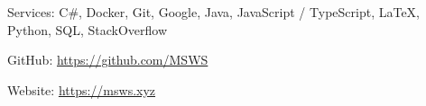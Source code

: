 \documentclass[10pt,letterpaper]{article}
\newenvironment{indentsection}[1]%
{\begin{list}{}%
	{\setlength{\leftmargin}{#1}}%
	\item[]%
}
{\end{list}}
\begin{document}
\begin{indentsection}{\parindent}
    \begin{description*}
        \item[Services:]
        C\#, Docker, Git, Google, Java, JavaScript / TypeScript, \LaTeX, Python, SQL, StackOverflow
        \item[GitHub:] \href{https://github.com/MSWS}{https://github.com/MSWS}
        \item[Website:] \href{https://msws.xyz}{https://msws.xyz}
    \end{description*}
\end{indentsection}
\end{document}
